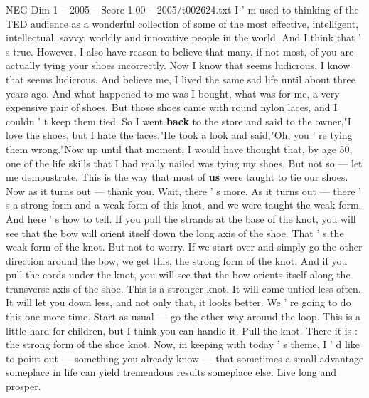 \begin{textsample}{NEG Dim 1 – 2005 – Score 1.00 – 2005/t002624.txt}  \label{ex:f1_neg_074}
I ' m used to thinking of the TED audience as a wonderful collection of some of the most effective, intelligent, intellectual, savvy, worldly and innovative people in the world.
And I think that ' s true.
However, I also have reason to believe that many, if not most, of you are actually tying your shoes incorrectly.
Now I know that seems ludicrous.
I know that seems ludicrous.
And believe me, I lived the same sad life until about three years ago.
And what happened to me was I bought, what was for me, a very expensive pair of shoes.
But those shoes came with round nylon laces, and I couldn ' t keep them tied.
So I went \textbf{back} to the store and said to the owner,"I love the shoes, but I hate the laces."He took a look and said,"Oh, you ' re tying them wrong."Now up until that moment, I would have thought that, by age 50, one of the life skills that I had really nailed was tying my shoes.
But not so — let me demonstrate.
This is the way that most of \textbf{us} were taught to tie our shoes.
Now as it turns out — thank you.
Wait, there ' s more.
As it turns out — there ' s a strong form and a weak form of this knot, and we were taught the weak form.
And here ' s how to tell.
If you pull the strands at the base of the knot, you will see that the bow will orient itself down the long axis of the shoe.
That ' s the weak form of the knot.
But not to worry.
If we start over and simply go the other direction around the bow, we get this, the strong form of the knot.
And if you pull the cords under the knot, you will see that the bow orients itself along the transverse axis of the shoe.
This is a stronger knot.
It will come untied less often.
It will let you down less, and not only that, it looks better.
We ' re going to do this one more time.
Start as usual — go the other way around the loop.
This is a little hard for children, but I think you can handle it.
Pull the knot.
There it is : the strong form of the shoe knot.
Now, in keeping with today ' s theme, I ' d like to point out — something you already know — that sometimes a small advantage someplace in life can yield tremendous results someplace else.
Live long and prosper.

\end{textsample}

